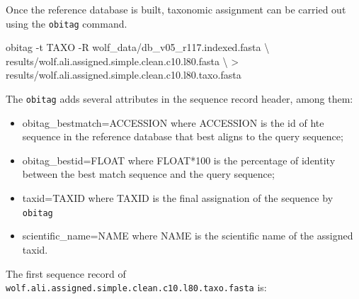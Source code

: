 \documentclass[
  letterpaper,
  DIV=11,
  numbers=noendperiod]{scrreprt}
\newenvironment{Shaded}{\begin{snugshade}}{\end{snugshade}}
\newcommand{\AttributeTok}[1]{\textcolor[rgb]{0.40,0.45,0.13}{#1}}
\newcommand{\DataTypeTok}[1]{\textcolor[rgb]{0.68,0.00,0.00}{#1}}
\newcommand{\ExtensionTok}[1]{\textcolor[rgb]{0.00,0.23,0.31}{#1}}
\newcommand{\NormalTok}[1]{\textcolor[rgb]{0.00,0.23,0.31}{#1}}
\newcommand{\OperatorTok}[1]{\textcolor[rgb]{0.37,0.37,0.37}{#1}}
\providecommand{\tightlist}{%
  \setlength{\itemsep}{0pt}\setlength{\parskip}{0pt}}\usepackage{longtable,booktabs,array}
\begin{document}
Once the reference database is built, taxonomic assignment can be
carried out using the \texttt{obitag} command.

\begin{Shaded}
\begin{Highlighting}[]
\ExtensionTok{obitag} \AttributeTok{{-}t}\NormalTok{ TAXO }\AttributeTok{{-}R}\NormalTok{ wolf\_data/db\_v05\_r117.indexed.fasta }\DataTypeTok{\textbackslash{}}
\NormalTok{       results/wolf.ali.assigned.simple.clean.c10.l80.fasta }\DataTypeTok{\textbackslash{}}
       \OperatorTok{\textgreater{}}\NormalTok{ results/wolf.ali.assigned.simple.clean.c10.l80.taxo.fasta}
\end{Highlighting}
\end{Shaded}

The \texttt{obitag} adds several attributes in the sequence record
header, among them:

\begin{itemize}
\tightlist
\item
  obitag\_bestmatch=ACCESSION where ACCESSION is the id of hte sequence
  in the reference database that best aligns to the query sequence;
\item
  obitag\_bestid=FLOAT where FLOAT*100 is the percentage of identity
  between the best match sequence and the query sequence;
\item
  taxid=TAXID where TAXID is the final assignation of the sequence by
  \texttt{obitag}
\item
  scientific\_name=NAME where NAME is the scientific name of the
  assigned taxid.
\end{itemize}

The first sequence record of
\texttt{wolf.ali.assigned.simple.clean.c10.l80.taxo.fasta} is:
\end{document}
